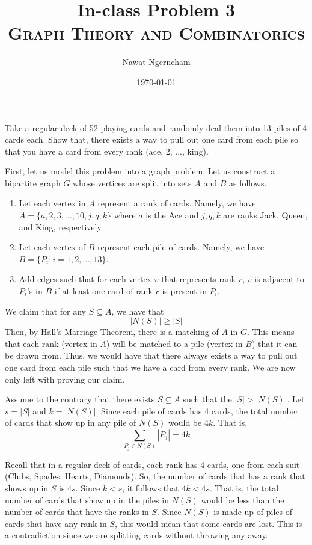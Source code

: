 \documentclass[answers]{exam}
\title{\Huge{{In-class Problem 3}}
	\\
\Large\scshape{{Graph Theory and Combinatorics}}}
\author{{Nawat Ngerncham}}
\date{\today}
\begin{document}
\maketitle

\begin{questions}
  \question 
    Take a regular deck of 52 playing cards and randomly deal them into 13 
    piles of 4 cards each. Show that, there exists a way to pull out one card
    from each pile so that you have a card from every rank (ace, 2, ..., king).

    \begin{solution}
      First, let us model this problem into a graph problem. Let us construct a
      bipartite graph \(G\) whose vertices are split into sets \(A\) and \(B\)
      as follows.
      \begin{enumerate}
        \item Let each vertex in \(A\) represent a rank of cards. Namely, we
          have \(A = \{a, 2, 3, ..., 10, j, q, k\}\) where \(a\) is the Ace 
          and \(j, q, k\) are ranks Jack, Queen, and King, respectively.
        \item Let each vertex of \(B\) represent each pile of cards. Namely, 
          we have \(B = \{P_i : i = 1, 2, ..., 13\}\). 
        \item Add edges such that for each vertex \(v\) that represents rank 
          \(r\), \(v\) is adjacent to \(P_i\)'s in \(B\) if at least one card of
          rank \(r\) is present in \(P_i\). 
      \end{enumerate}

      We claim that for any \(S \subseteq A\), we have that
      \[ |N(S)| \geq |S| \]
      Then, by Hall's Marriage Theorem, there is a matching of \(A\) in \(G\).
      This means that each rank (vertex in \(A\)) will be matched to a pile
      (vertex in \(B\)) that it can be drawn from. Thus, we would have that
      there always exists a way to pull out one card from each pile such that we
      have a card from every rank. We are now only left with proving our claim.

      Assume to the contrary that there exists \(S \subseteq A\) such that the
      \(|S| > |N(S)|\). Let \(s = |S|\) and \(k = |N(S)|\). Since each pile of
      cards has 4 cards, the total number of cards that show up in any
      pile of \(N(S)\) would be \(4k\). That is, 
      \[ \sum_{P_j \in N(S)} |P_j| = 4k \]

      Recall that in a regular deck of cards, each rank has 4 cards, one from
      each suit (Clubs, Spades, Hearts, Diamonds). So, the number of cards that
      has a rank that shows up in \(S\) is \(4s\). Since \(k < s\), it follows
      that \(4k < 4s\). That is, the total number of cards that show up in the
      piles in \(N(S)\) would be less than the number of cards that have the 
      ranks in \(S\). Since \(N(S)\) is made up of piles of cards that have any 
      rank in \(S\), this would mean that some cards are lost. This is a
      contradiction since we are splitting cards without throwing any away. 


\end{solution}
\end{questions}
\end{document}

